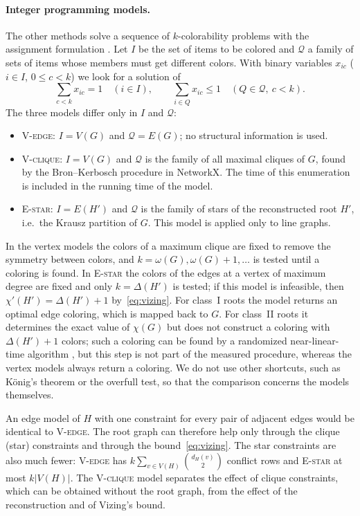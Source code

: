 \documentclass[11pt,a4paper]{article}
\newcommand{\Vedge}{\textsc{V-edge}}
\newcommand{\Vclique}{\textsc{V-clique}}
\newcommand{\Estar}{\textsc{E-star}}
\begin{document}
\paragraph{Integer programming models.}
The other methods solve a sequence of $k$-colorability problems with the
assignment formulation \cite{mendez2006}. Let $I$ be the set of items to be
colored and $\mathcal{Q}$ a family of sets of items whose members must get
different colors. With binary variables $x_{ic}$ ($i\in I$, $0\le c<k$) we look
for a solution of
\begin{equation}\label{eq:ilp}
\sum_{c<k}x_{ic}=1\quad(i\in I),\qquad
\sum_{i\in Q}x_{ic}\le 1\quad(Q\in\mathcal{Q},\ c<k).
\end{equation}
The three models differ only in $I$ and $\mathcal{Q}$:
\begin{itemize}\setlength{\itemsep}{1pt}
\item \Vedge: $I=V(G)$ and $\mathcal{Q}=E(G)$; no structural information is used.
\item \Vclique: $I=V(G)$ and $\mathcal{Q}$ is the family of all maximal cliques
of $G$, found by the Bron--Kerbosch procedure in NetworkX. The time of this
enumeration is included in the running time of the model.
\item \Estar: $I=E(H')$ and $\mathcal{Q}$ is the family of stars of the
reconstructed root $H'$, i.e.\ the Krausz partition of $G$. This model is
applied only to line graphs.
\end{itemize}
In the vertex models the colors of a maximum clique are fixed to remove the
symmetry between colors, and $k=\omega(G),\omega(G)+1,\dots$ is tested until a
coloring is found. In \Estar{} the colors of the edges at a vertex of maximum
degree are fixed and only $k=\Delta(H')$ is tested; if this model is infeasible,
then $\chi'(H')=\Delta(H')+1$ by~\eqref{eq:vizing}. For class~I roots the model
returns an optimal edge coloring, which is mapped back to $G$. For class~II
roots it determines the exact value of $\chi(G)$ but does not construct a
coloring with $\Delta(H')+1$ colors; such a coloring can be found by a
randomized near-linear-time algorithm \cite{assadi2025}, but this step is not part of the measured
procedure, whereas the vertex models always return a coloring. We do not use other
shortcuts, such as K\"onig's theorem or the overfull test, so that the
comparison concerns the models themselves.

An edge model of $H$ with one constraint for every pair of adjacent edges
would be identical to \Vedge{}. The root graph can therefore help only through
the clique (star) constraints and through the bound~\eqref{eq:vizing}. The
star constraints are also much fewer: \Vedge{} has
$k\sum_{v\in V(H)}\binom{d_H(v)}{2}$ conflict rows and \Estar{} at most
$k|V(H)|$. The \Vclique{} model separates the effect of clique constraints,
which can be obtained without the root graph, from the effect of the
reconstruction and of Vizing's bound.
\end{document}
